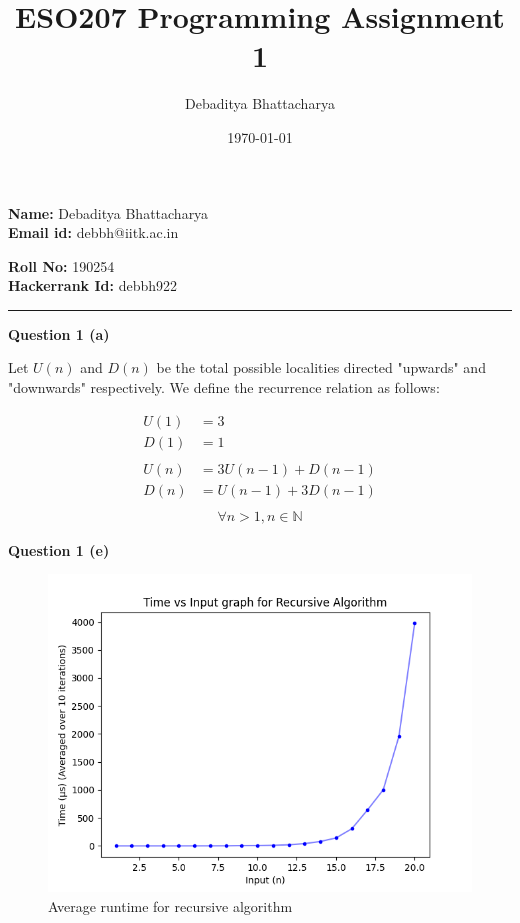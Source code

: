 \documentclass[10pt, a4paper]{article}
\title{ESO207 Programming Assignment 1}
\author{Debaditya Bhattacharya}
\date{\today}
\begin{document}
\maketitle

\noindent\begin{minipage}{2in}
    \textbf{Name: }Debaditya Bhattacharya \\
    \textbf{Email id: }debbh@iitk.ac.in  
\end{minipage}
\hfill
\noindent\begin{minipage}{1.9in}
    \textbf{Roll No: }190254\\
    \textbf{Hackerrank Id: }debbh922
\end{minipage}

\noindent\rule{\textwidth}{1px}

\noindent\large{\textbf{Question 1 (a)}}
\vspace{5pt}

\noindent\normalsize Let $U(n)$ and $D(n)$ be the total possible localities directed "upwards" and "downwards"
respectively. We define the recurrence relation as follows:

\begin{align*}
    U(1) &= 3\\
    D(1) &= 1\\\\
    U(n) &= 3U(n-1) + D(n-1)\\
    D(n) &= U(n-1) + 3D(n-1)\\
\end{align*}
\vspace{-1.5cm}
\begin{align*}
    \forall n > 1, n \in \mathbb{N}
\end{align*}

\noindent\large{\textbf{Question 1 (e)}}

\begin{figure}[h]
    \centering
    \includegraphics[width=15cm]{Recursive_Plot.png}
    \caption{Average runtime for recursive algorithm}
    \label{fig:m}
\end{figure}
\end{document}
